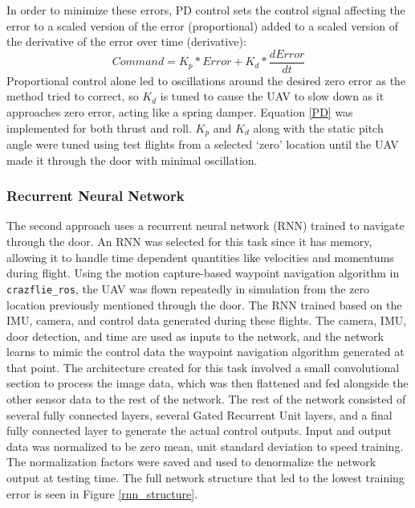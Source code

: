 \documentclass[12pt]{article}
\begin{document}
In order to minimize these errors, PD control sets the control signal affecting the error to a scaled version of the error (proportional) added to a scaled version of the derivative of the error over time (derivative):
\begin{equation}
Command = K_{p}*Error + K_{d} * \frac{dError}{dt}
\label{PD}
\end{equation}
Proportional control alone led to oscillations around the desired zero error as the method tried to correct, so $K_d$ is tuned to cause the UAV to slow down as it approaches zero error, acting like a spring damper. Equation \ref{PD} was implemented for both thrust and roll. $K_p$ and $K_d$ along with the static pitch angle were tuned using test flights from a selected `zero' location until the UAV made it through the door with minimal oscillation.

\subsubsection{Recurrent Neural Network}
The second approach uses a recurrent neural network (RNN) trained to navigate through the door. An RNN was selected for this task since it has memory, allowing it to handle time dependent quantities like velocities and momentums during flight. Using the motion capture-based waypoint navigation algorithm in \verb|crazflie_ros|, the UAV was flown repeatedly in simulation from the zero location previously mentioned through the door. The RNN trained based on the IMU, camera, and control data generated during these flights. The camera, IMU, door detection, and time are used as inputs to the network, and the network learns to mimic the control data the waypoint navigation algorithm generated at that point. The architecture created for this task involved a small convolutional section to process the image data, which was then flattened and fed alongside the other sensor data to the rest of the network. The rest of the network consisted of several fully connected layers, several Gated Recurrent Unit layers, and a final fully connected layer to generate the actual control outputs. Input and output data was normalized to be zero mean, unit standard deviation to speed training. The normalization factors were saved and used to denormalize the network output at testing time. The full network structure that led to the lowest training error is seen in Figure \ref{rnn_structure}.
\end{document}

